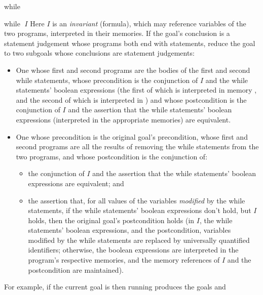 \begin{tactic}{while}
  \begin{tsyntax}{while $\;I$}
    Here $I$ is an \emph{invariant} (formula), which may reference
    variables of the two programs, interpreted in their memories.  If
    the goal's conclusion is a \prhl statement judgement whose
    programs both end with  statements, reduce the goal to
    two subgoals whose conclusions are \prhl statement judgements:
    \begin{itemize}
    \item One whose first and second programs are the bodies of the
      first and second while statements, whose precondition is the
      conjunction of $I$ and the while statements' boolean expressions (the
      first of which is interpreted in memory , and the second
      of which is interpreted in ) and whose postcondition is
      the conjunction of $I$ and the assertion that the while statements'
      boolean expressions (interpreted in the appropriate memories)
      are equivalent.

    \item One whose precondition is the original goal's precondition,
      whose first and second programs are all the results of removing
      the while statements from the two programs, and whose postcondition is
      the conjunction of:
      \begin{itemize}
      \item the conjunction of $I$ and the assertion that the while statements'
        boolean expressions are equivalent; and

      \item the assertion that, for all values of the variables
        \emph{modified} by the while statements, if the while statements'
        boolean expressions don't hold, but $I$ holds, then the
        original goal's postcondition holds (in $I$, the while statements'
        boolean expressions, and the postcondition, variables modified
        by the while statements are replaced by universally quantified
        identifiers; otherwise, the boolean expressions are
        interpreted in the program's respective memories, and the
        memory references of $I$ and the postcondition are
        maintained).
      \end{itemize}
    \end{itemize}

  \medskip
  For example, if the current goal is
   then
  running 
  produces the goals
  and
  \end{tsyntax}


\end{tactic}
